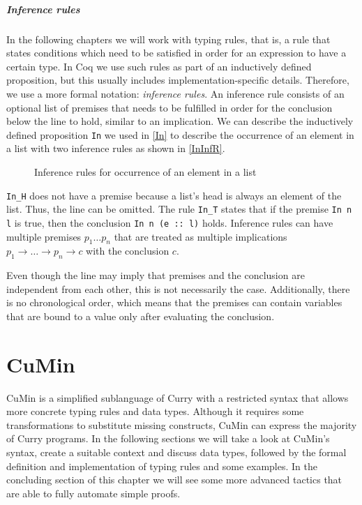 \documentclass[paper = a4, fleqn, abstract=on, twoside]{scrreprt}
\newcommand{\coqinline}[1]{\texttt{#1}}
\begin{document}
\paragraph{Inference rules}
In the following chapters we will work with typing rules, that is, a rule that states conditions which need to be satisfied in order for an expression to have a certain type. In Coq we use such rules as part of an inductively defined proposition, but this usually includes implementation-specific details. Therefore, we use a more formal notation: \textit{inference rules}.\label{infrules} An inference rule consists of an optional list of premises that needs to be fulfilled in order for the conclusion below the line to hold, similar to an implication.
We can describe the inductively defined proposition \coqinline{In} we used in \autoref{In} to describe the occurrence of an element in a list with two inference rules as shown in \autoref{InInfR}.
\begin{figure}[H]
	\begin{center}
		\begin{minipage}{.45 \linewidth}
			\infer[\text{\texttt{In\_H}}]{\coqinline{In n (n :: l)}}{\phantom{premise}}
		\end{minipage}
		\hspace{.1 \linewidth}
		\begin{minipage}{.45 \linewidth}
			\infer[\text{\texttt{In\_T}}]{\coqinline{In n (e :: l)}}{\coqinline{In n l}}
		\end{minipage}
	\end{center}
	\caption{Inference rules for occurrence of an element in a list}
	\label{InInfR}
\end{figure} \noindent
\texttt{In\_H} does not have a premise because a list's head is always an element of the list. Thus, the line can be omitted. The rule \texttt{In\_T} states that if the premise \texttt{In n l} is true, then the conclusion \texttt{In n (e :: l)} holds. Inference rules can have multiple premises $p_1 \dots p_n$ that are treated as multiple implications $p_1 \rightarrow \dots \rightarrow p_n \rightarrow c$ with the conclusion $c$.
\par
Even though the line may imply that premises and the conclusion are independent from each other, this is not necessarily the case. Additionally, there is no chronological order, which means that the premises can contain variables that are bound to a value only after evaluating the conclusion.
\chapter{CuMin}
\label{cumin}
CuMin is a simplified sublanguage of Curry with a restricted syntax that allows more concrete typing rules and data types. Although it requires some transformations to substitute missing constructs, CuMin can express the majority of Curry programs. In the following sections we will take a look at CuMin's syntax\cite{p19mehner}, create a suitable context and discuss data types, followed by the formal definition and implementation of typing rules and some examples. In the concluding section of this chapter we will see some more advanced tactics that are able to fully automate simple proofs.
\end{document}
